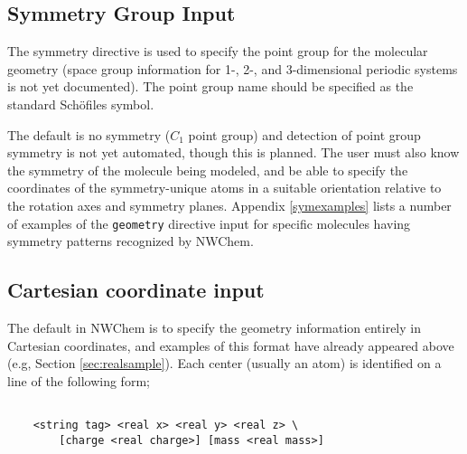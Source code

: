 \subsection{Symmetry Group Input}

The symmetry directive is used to specify the point group for the
molecular geometry (space group information for 1-, 2-, and
3-dimensional periodic systems is not yet documented).  The point
group name should be specified as the standard Sch\"{o}files symbol.

The default is no symmetry ($C_1$ point group) and detection of point
group symmetry is not yet automated, though this is planned.  The user
must also know the symmetry of the molecule being modeled, and be able
to specify the coordinates of the symmetry-unique atoms in a suitable
orientation relative to the rotation axes and symmetry planes.
Appendix \ref{symexamples} lists a number of examples of the
\verb+geometry+ directive input for specific molecules having symmetry
patterns recognized by NWChem.

\subsection{Cartesian coordinate input}
\label{sec:cart}

The default in NWChem is to specify the geometry information entirely
in Cartesian coordinates, and examples of this format have already
appeared above (e.g, Section \ref{sec:realsample}). Each center
(usually an atom) is identified on a line of the following form;
\begin{verbatim}

    <string tag> <real x> <real y> <real z> \
        [charge <real charge>] [mass <real mass>]

\end{verbatim}

